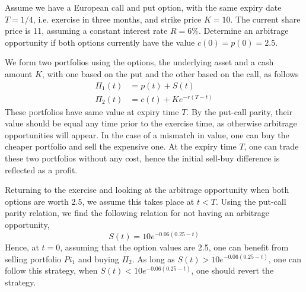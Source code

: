 \documentclass[12pt,a4paper]{exam}
\begin{document}
\begin{questions}
\begin{solution}
\begin{enumerate}[label=(\alph*),font=\itshape]
\end{enumerate}
\end{solution}

\question Assume we have a European call and put option, with the same expiry date $T=1/4$, i.e. exercise in three months, and strike price $K=10$. The current share price is 11, assuming a constant interest rate $R=6\%$. Determine an arbitrage opportunity if both options currently have the value $c(0)=p(0)=2.5$.

\fillwithlines{3cm}
\begin{solution}
We form two portfolios using the options, the underlying asset and a cash amount $K$, with one based on the put and the other based on the call, as follows
\begin{equation*}
\begin{aligned}
\Pi_1(t) &= p(t) + S(t)\\
\Pi_2(t) &= c(t) + Ke^{-r(T-t)}
\end{aligned}
\end{equation*}
These portfolios have same value at expiry time $T$. By the put-call parity, their value should be equal any time prior to the exercise time, as otherwise arbitrage opportunities will appear. In the case of a mismatch in value, one can buy the cheaper portfolio and sell the expensive one. At the expiry time $T$, one can trade these two portfolios without any cost, hence the initial sell-buy difference is reflected as a profit. 

Returning to the exercise and looking at the arbitrage opportunity when both options are worth 2.5, we assume this takes place at $t < T$. Using the put-call parity relation, we find the following relation for not having an arbitrage opportunity, 
\begin{equation*}
S(t) = 10e^{-0.06(0.25-t)}
\end{equation*}
Hence, at $t = 0$, assuming that the option values are 2.5, one can benefit from selling portfolio $Pi_1$ and buying $\Pi_2$. As long as $S(t) > 10 e^{
-0.06(0.25-t)}$, one can follow this strategy, when $S(t) < 10 e^{-0.06(0.25-t)}$, one should revert the strategy.
\end{solution}


\end{questions}
\end{document}
